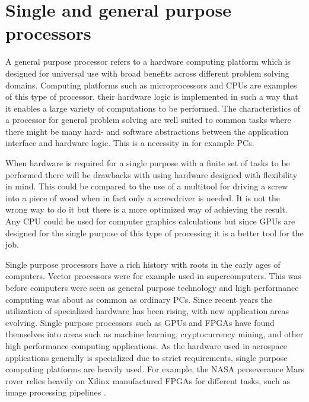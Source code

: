 \documentclass[12pt]{report}
\begin{document}
\section{Single and general purpose processors}
A general purpose processor refers to a hardware computing platform which is designed for universal use with broad benefits across different problem solving domains. Computing platforms such as microprocessors and CPUs are examples of this type of processor, their hardware logic is implemented in such a way that it enables a large variety of computations to be performed. 
The characteristics of a processor for general problem solving are well suited to common tasks where there might be many hard- and software abstractions between the application interface and hardware logic. This is a necessity in for example PCs.
\par
When hardware is required for a single purpose with a finite set of tasks to be performed there will be drawbacks with using hardware designed with flexibility in mind. This could be compared to the use of a multitool for driving a screw into a piece of wood when in fact only a screwdriver is needed. It is not the wrong way to do it but there is a more optimized way of achieving the result. Any CPU could be used for computer graphics calculations but since GPUs are designed for the single purpose of this type of processing it is a better tool for the job.
\par
Single purpose processors have a rich history with roots in the early ages of computers. Vector processors were for example used in supercomputers.
This was before computers were seen as general purpose technology and high performance computing was about as common as ordinary PCs.
Since recent years the utilization of specialized hardware has been rising, with new application areas evolving. Single purpose processors such as GPUs and FPGAs have found themselves into areas such as machine learning, cryptocurrency mining, and other high performance computing applications.
As the hardware used in aerospace applications generally is specialized due to strict requirements, single purpose computing platforms are heavily used. For example, the NASA perseverance Mars rover relies heavily on Xilinx manufactured FPGAs for different tasks, such as image processing pipelines \citep{XilPerservance}.
\end{document}
